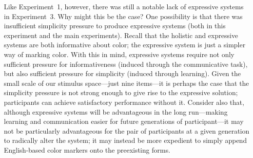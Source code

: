 \documentclass[doc,biblatex]{apa7}
\begin{document}
Like Experiment~1, however, there was still a notable lack of expressive systems in Experiment~3. Why might this be the case? One possibility is that there was insufficient simplicity pressure to produce expressive systems (both in this experiment and the main experiments). Recall that the holistic and expressive systems are both informative about color; the expressive system is just a simpler way of marking color. With this in mind, expressive systems require not only sufficient pressure for informativeness (induced through the communicative task), but also sufficient pressure for simplicity (induced through learning). Given the small scale of our stimulus space---just nine items---it is perhaps the case that the simplicity pressure is not strong enough to give rise to the expressive solution; participants can achieve satisfactory performance without it. Consider also that, although expressive systems will be advantageous in the long run---making learning and communication easier for future generations of participant---it may not be particularly advantageous for the pair of participants at a given generation to radically alter the system; it may instead be more expedient to simply append English-based color markers onto the preexisting forms.
\end{document}
